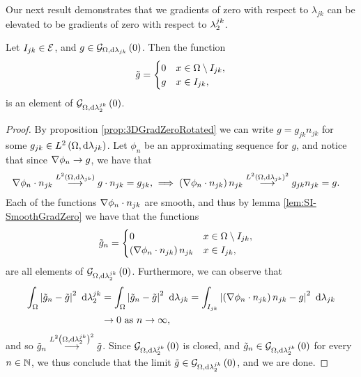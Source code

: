 Our next result demonstrates that we gradients of zero with respect to $\lambda_{jk}$ can be elevated to be gradients of zero with respect to $\lambda_2^{jk}$.
\begin{lemma} \label{lem:SI-GradZeroEdgeToComposite}
	Let $I_{jk}\in\mathcal{E}$, and $g\in\mathcal{G}_{ \Omega, \mathrm{d}\lambda_{jk}}\left( 0 \right)$.
	Then the function
	\begin{align*}
		\tilde{g} = \begin{cases} 0 & x\in\Omega\setminus I_{jk}, \\ g & x\in I_{jk}, \end{cases}
	\end{align*}
	is an element of $\mathcal{G}_{ \Omega, \mathrm{d}\lambda_2^{jk}}\left( 0 \right)$.
\end{lemma}
\begin{proof}
	By proposition \ref{prop:3DGradZeroRotated} we can write $g = g_{jk}n_{jk}$ for some $g_{jk}\in L^{2}\left( \Omega,\mathrm{d} \lambda_{jk} \right)$.
	Let $\phi_n$ be an approximating sequence for $g$, and notice that since $\nabla\phi_n\rightarrow g$, we have that
	\begin{align*}
		\nabla\phi_n\cdot n_{jk} \overset{L^{2}\left( \Omega,\mathrm{d} \lambda_{jk} \right)}{\longrightarrow} g\cdot n_{jk} = g_{jk}, 
		&\implies
		\left(  \nabla\phi_n\cdot n_{jk}  \right)n_{jk} \overset{L^{2}\left( \Omega,\mathrm{d} \lambda_{jk} \right)^2}{\longrightarrow} g_{jk}n_{jk} = g.
	\end{align*}
	Each of the functions $\nabla\phi_n\cdot n_{jk}$ are smooth, and thus by lemma \ref{lem:SI-SmoothGradZero} we have that the functions
	\begin{align*}
		\tilde{g}_n &= \begin{cases} 0 & x\in\Omega\setminus I_{jk}, \\ \left(  \nabla\phi_n\cdot n_{jk}  \right)n_{jk} & x\in I_{jk}, \end{cases}
	\end{align*}
	are all elements of $\mathcal{G}_{ \Omega, \mathrm{d}\lambda_2^{jk}}\left( 0 \right)$.
	Furthermore, we can observe that
	\begin{align*}
		\int_{\Omega}\left\lvert  \tilde{g}_n - \tilde{g}  \right\rvert^2 \ \mathrm{d}\lambda_2^{jk}
		&= \int_{\Omega}\left\lvert  \tilde{g}_n - \tilde{g}  \right\rvert^2 \ \mathrm{d}\lambda_{jk}
		= \int_{I_{jk}}\left\lvert  \left(  \nabla\phi_n\cdot n_{jk}  \right)n_{jk} - g  \right\rvert^2 \ \mathrm{d}\lambda_{jk} \\
		&\rightarrow 0 \ \text{as} \ n \rightarrow\infty,
	\end{align*}
	and so $\tilde{g}_n\overset{L^{2}\left( \Omega,\mathrm{d} \lambda_2^{jk} \right)^2}{\longrightarrow}\tilde{g}$.
	Since $\mathcal{G}_{ \Omega, \mathrm{d}\lambda_2^{jk}}\left( 0 \right)$ is closed, and $\tilde{g}_n\in\mathcal{G}_{ \Omega, \mathrm{d}\lambda_2^{jk}}\left( 0 \right)$ for every $n\in\mathbb{N}$, we thus conclude that the limit $\tilde{g}\in\mathcal{G}_{ \Omega, \mathrm{d}\lambda_2^{jk}}\left( 0 \right)$, and we are done.
\end{proof}

